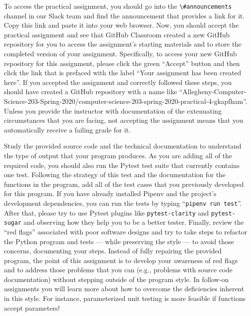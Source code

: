\documentclass[11pt]{article}
\newcommand{\command}[1]{``\lstinline{#1}''}
\newcommand{\program}[1]{\lstinline{#1}}
\newcommand{\channel}[1]{\lstinline{#1}}
\begin{document}
To access the practical assignment, you should go into the
\channel{\#announcements} channel in our Slack team and find the announcement
that provides a link for it. Copy this link and paste it into your web browser.
Now, you should accept the practical assignment and see that GitHub Classroom
created a new GitHub repository for you to access the assignment's starting
materials and to store the completed version of your assignment. Specifically,
to access your new GitHub repository for this assignment, please click the green
``Accept'' button and then click the link that is prefaced with the label ``Your
assignment has been created here''. If you accepted the assignment and correctly
followed these steps, you should have created a GitHub repository with a name
like
``Allegheny-Computer-Science-203-Spring-2020/computer-science-203-spring-2020-practical-4-gkapfham''.
Unless you provide the instructor with documentation of the extenuating
circumstances that you are facing, not accepting the assignment means that you
automatically receive a failing grade for it.


Study the provided source code and the technical documentation to understand the
type of output that your program produces.
%
As you are adding all of the required code, you should also run the Pytest test
suite that currently contains one test. Following the strategy of this test and
the documentation for the functions in the program, add all of the test cases
that you previously developed for this program.
%
If you have already installed Pipenv and the project's development dependencies,
you can run the tests by typing \command{pipenv run test}.
%
After that, please try to use Pytest plugins like \program{pytest-clarity} and
\program{pytest-sugar} and observing how they help you to be a better tester.
%
Finally, review the ``red flags'' associated with poor software designs and try
to take steps to refactor the Python program and tests --- while preserving the
style --- to avoid those concerns, documenting your steps.
%
Instead of fully repairing the provided program, the point of this assignment is
to develop your awareness of red flags and to address those problems that you
can (e.g., problems with source code documentation) without stepping outside of
the program style.
%
In follow-on assignments you will learn more about how to overcome the
deficiencies inherent in this style.
%
For instance, parameterized unit testing is more feasible if functions accept
parameters!
\end{document}
